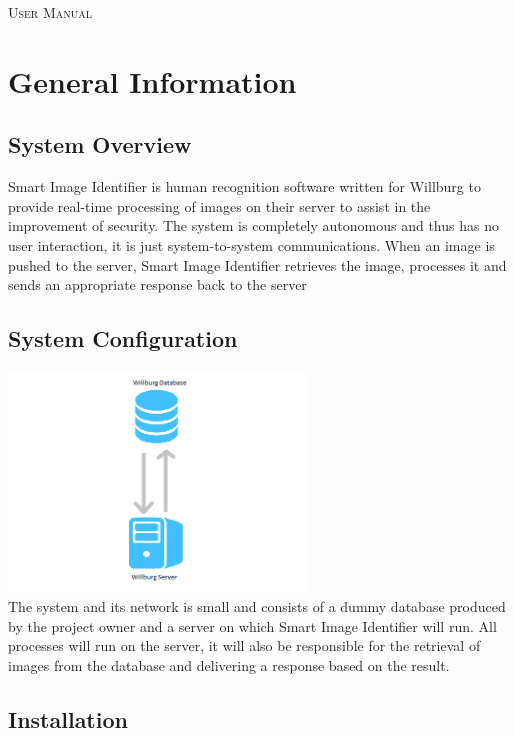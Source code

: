 \documentclass[a4paper,12pt]{report}
\begin{document}
\renewcommand{\thesection}{\arabic{section}}
\newpage
\tableofcontents
\newpage

\begin{center}
\textsc{\LARGE User Manual}\\[1.5cm]
\end{center}

\section{General Information}
\subsection{System Overview}
Smart Image Identifier is human recognition software written for Willburg to provide real-time processing of images on their server to assist in the improvement of security. The system is completely autonomous and thus has no user interaction, it is just system-to-system communications. 
\newline\newline
When an image is pushed to the server, Smart Image Identifier retrieves the image, processes it and sends an appropriate response back to the server

\subsection{System Configuration}
\includegraphics[width=8cm]{System.png}\\
 The system and its network is small and consists of a dummy database produced by the project owner and a server on which Smart Image Identifier will run. \linebreak
 All processes will run on the server, it will also be responsible for the retrieval of images from the database and delivering a response based on the result.
\subsection{Installation}
\end{document}
